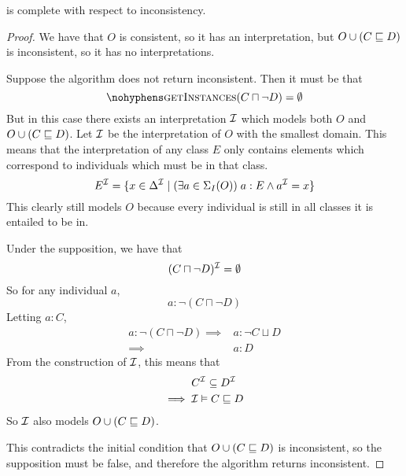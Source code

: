 \documentclass[paper.tex]{subfiles}
\begin{document}
\begin{proposition}
  \label{prop:testSubClassOfInconsistentComplete}
   is complete with respect to inconsistency.
\end{proposition}
\begin{proof}
  We have that $O$ is consistent, so it has an interpretation, but $O \cup (C \sqsubseteq D)$ is inconsistent, so it has no interpretations.

  Suppose the algorithm does not return inconsistent.  Then it must be that
  \[ \textproc{getInstances}(C \sqcap \neg D) = \emptyset \]
  But in this case there exists an interpretation $\mathcal{I}$ which models both $O$ and $O \cup (C \sqsubseteq D)$.  Let $\mathcal{I}$ be the interpretation of $O$ with the smallest domain.  This means that the interpretation of any class $E$ only contains elements which correspond to individuals which must be in that class.
  \[ E^{\mathcal{I}} = \{ x \in \Delta^{\mathcal{I}} \mid (\exists a \in \Sigma_I(O)) \; a : E \land a^{\mathcal{I}} = x \} \]
  This clearly still models $O$ because every individual is still in all classes it is entailed to be in.

  Under the supposition, we have that
  \[ (C \sqcap \neg D)^{\mathcal{I}} = \emptyset \]
  So for any individual $a$,
  \[ a : \neg (C \sqcap \neg D) \]
  Letting $a : C$,
  \begin{align*}
    a : \neg (C \sqcap \neg D)
    \implies{}& a : \neg C \sqcup D \\
    \implies{}& a : D
  \end{align*}
  From the construction of $\mathcal{I}$, this means that
  \begin{align*}
    & C^{\mathcal{I}} \subseteq D^{\mathcal{I}} \\
    \implies{}& \mathcal{I} \vDash C \sqsubseteq D
  \end{align*}
  So $\mathcal{I}$ also models $O \cup (C \sqsubseteq D)$.

  This contradicts the initial condition that $O \cup (C \sqsubseteq D)$ is inconsistent, so the supposition must be false, and therefore the algorithm returns inconsistent.
\end{proof}
\end{document}
